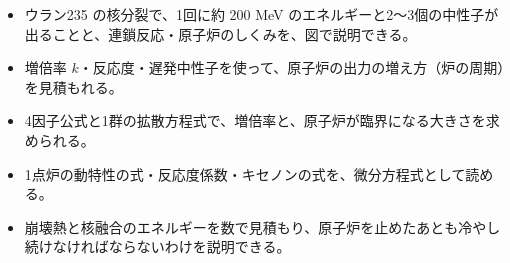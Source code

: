 \makeatletter
\newcommand\txpn[1]{\filldraw[fill=bkBlue!25, draw=bkBlue!80!black, line width=0.6pt] #1 circle (1.3);}
\newcommand\txpnuc[3]{\shade[ball color=#3!55] #1 circle (#2); \draw[bkInk, line width=0.5pt] #1 circle (#2);}
\makeatother


\begin{goal}
\begin{itemize}[label={\color{bkTheme}●}, leftmargin=1.6\zw, itemsep=0pt, topsep=1pt]
\item {}\enspace ウラン235 の核分裂で、1回に約 200 MeV のエネルギーと2〜3個の中性子が出ることと、連鎖反応・原子炉のしくみを、図で説明できる。
\item {}\enspace 増倍率 $k$・反応度・遅発中性子を使って、原子炉の出力の増え方（炉の周期）を見積もれる。
\item {}\enspace 4因子公式と1群の拡散方程式で、増倍率と、原子炉が臨界になる大きさを求められる。
\item {}\enspace 1点炉の動特性の式・反応度係数・キセノンの式を、微分方程式として読める。
\item {}\enspace 崩壊熱と核融合のエネルギーを数で見積もり、原子炉を止めたあとも冷やし続けなければならないわけを説明できる。
\end{itemize}
\end{goal}

